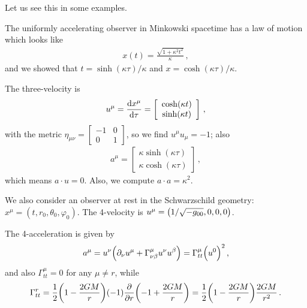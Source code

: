 \documentclass[main.tex]{subfiles}
\begin{document}
Let us see this in some examples. 

The uniformly accelerating observer in Minkowski spacetime has a law of motion which looks like 
%
\begin{align}
  x(t) = \frac{\sqrt{1 + \kappa^2 t^2   }}{\kappa }
\,,
\end{align}
%
and we showed that \(t = \sinh (\kappa \tau ) / \kappa \) and \(x = \cosh( \kappa \tau ) / \kappa \). 

The three-velocity is 
%
\begin{subequations}
\begin{align}
  u^{\mu } = \dv{x^{\mu }}{\tau } = \left[\begin{array}{c}
  \cosh(\kappa t) \\ 
  \sinh(\kappa t)
  \end{array}\right]
\,,
\end{align}
\end{subequations}
%
with the metric \(\eta_{\mu \nu } = \left[\begin{array}{cc}
-1 & 0 \\ 
0 & 1
\end{array}\right]\), so we find \(u^{ \mu } u_{\mu } = -1\); also 
%
\begin{subequations}
\begin{align}
  a^{\mu } = \left[\begin{array}{c}
  \kappa \sinh(\kappa \tau ) \\ 
  \kappa \cosh(\kappa \tau )
  \end{array}\right]
\,,
\end{align}
\end{subequations}
%
which means \(a \cdot u = 0\). 
Also, we compute \(a \cdot a = \kappa^2\). 

We also consider an observer at rest in the Schwarzschild geometry: \(x^{\mu } = (t, r_0 , \theta_0 , \varphi_0 )\). The 4-velocity is \(u^{\mu } = \qty(1/\sqrt{-g_{00} }, 0, 0, 0)\). 

The 4-acceleration is given by 
%
\begin{align}
  a^{\mu } = u^{\nu } \qty( \partial_{\nu } u^{\mu } + \Gamma^{\mu }_{\nu \beta } u^{\nu } u^{\beta })
  = \Gamma^{\mu }_{tt} \qty(u^{0})^2
\,,
\end{align}
%
and also \(\Gamma^{\mu }_{tt} = 0\) for any \(\mu \neq r\), while 
%
\begin{align}
    \Gamma^{r}_{tt} =  \frac{1}{2} \qty(1 - \frac{2GM}{r}   ) (-1) \pdv{}{r} \qty(-1 + \frac{2GM}{r})
    = \frac{1}{2} \qty(1 - \frac{2GM}{r}) \frac{2GM}{r^2}
\,.
\end{align}
\end{document}
